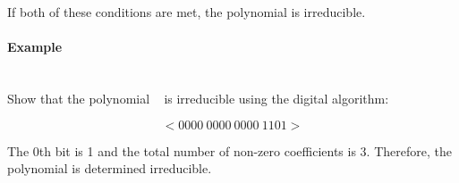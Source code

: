     If both of these conditions are met, the polynomial is irreducible.

    \paragraph{Example} \leavevmode \\ Show that the polynomial
    \examplepoly~ is irreducible using the digital algorithm:

        \[ <0000 \ 0000 \ 0000 \ 1101> \]

    The 0th bit is 1 and the total number of non-zero coefficients is
    3. Therefore, the polynomial is determined irreducible.
